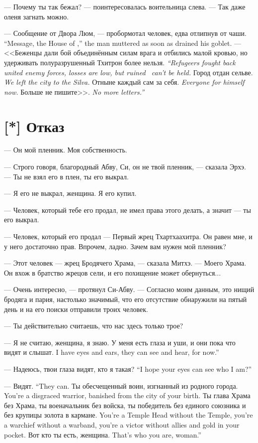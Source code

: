 --- Почему ты так бежал? --- поинтересовалась воительница слева.
--- Так даже оленя загнать можно.

{--- Сообщение от Двора Люм, --- пробормотал человек, едва отлипнув от чаши.}
{``Message, the House of \Loem,'' the man muttered as soon as drained his goblet.}
{--- <<Беженцы дали бой объединённым силам врага и отбились малой кровью, но удерживать полуразрушенный Тхитрон более нельзя.}
{\emph{``Refugeers fought back united enemy forces, losses are low, but ruined \Tchitron\ can't be held.}}
{Город отдан сельве.}
{\emph{We left the city to the Silva.}}
{Отныне каждый сам за себя.}
{\emph{Everyone for himself now.}}
{Больше не пишите>>.}
{\emph{No more letters.''}}

\section{[*] Отказ}

\textspace

--- Он мой пленник.
Моя собственность.

--- Строго говоря, благородный Абву, Си, он не твой пленник, --- сказала Эрхэ.
--- Ты не взял его в плен, ты его выкрал.

--- Я его не выкрал, женщина.
Я его купил.

--- Человек, который тебе его продал, не имел права этого делать, а значит --- ты его выкрал.

--- Человек, который его продал --- Первый жрец Тхартхаахитра.
Он равен мне, и у него достаточно прав.
Впрочем, ладно.
Зачем вам нужен мой пленник?

--- Этот человек --- жрец Бродячего Храма, --- сказала Митхэ.
--- Моего Храма.
Он вхож в братство жрецов сели, и его похищение может обернуться...

--- Очень интересно, --- протянул Си-Абву.
--- Согласно моим данным, это нищий бродяга и пария, настолько значимый, что его отсутствие обнаружили на пятый день и на его поиски отправили троих человек.

--- Ты действительно считаешь, что нас здесь только трое?

--- Я не считаю, женщина, я знаю.
{У меня есть глаза и уши, и они пока что видят и слышат.}
{I have eyes and ears, they can see and hear, for now.''}

{--- Надеюсь, твои глаза видят, кто я такая?}
{``I hope your eyes can see who I am?''}

{--- Видят.}
{``They can.}
{Ты обесчещенный воин, изгнанный из родного города.}
{You're a disgraced warrior, banished from the city of your birth.}
{Ты глава Храма без Храма, ты военачальник без войска, ты победитель без единого союзника и без крупицы золота в кармане.}
{You're a Temple Head without the Temple, you're a warchief without a warband, you're a victor without allies and gold in your pocket.}
{Вот кто ты есть, женщина.}
{That's who you are, woman.''}

